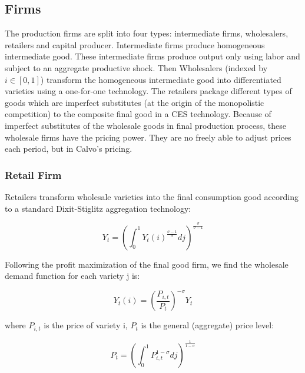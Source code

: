 \documentclass[cn,10pt,math=newtx,citestyle=gb7714-2015,bibstyle=gb7714-2015]{elegantbook}
\begin{document}
{{			
			
			\subsection{Firms}
			
			The production firms are split into four types: intermediate firms, wholesalers, retailers and capital producer. Intermediate firms produce homogeneous intermediate good. These intermediate firms produce output only using labor and subject to an aggregate productive shock. Then Wholesalers (indexed by $i \in [0, 1]$) transform the homogeneous intermediate good into differentiated varieties using a one-for-one technology. The retailers package different types of goods which are imperfect substitutes (at the origin of the monopolistic competition) to the composite final good in a CES technology. Because of imperfect substitutes of the wholesale goods in final production process, these wholesale firms have the pricing power. They are no freely able to adjust prices each period, but in Calvo's pricing.
			
			\subsubsection{Retail Firm}
			
			Retailers transform wholesale varieties into the final consumption good according to a standard Dixit-Stiglitz aggregation technology:
			
			\begin{equation}
				Y_t=\left(\int_0^1Y_t(i)^{\frac{\sigma-1}{\sigma}}dj \right)^{\frac{\sigma}{\sigma-1}}
			\end{equation}
			
			Following the profit maximization of the final good firm, we find the wholesale demand function for each variety j is:
			
			\begin{equation}
				Y_t(i)=\left(\frac{P_{i,t}}{P_t}\right)^{-\sigma}Y_t
			\end{equation}
			
			where $P_{i,t}$ is the price of variety i, $P_t$ is the general (aggregate) price level:
			
			\begin{equation}
				P_t=\left(\int_0^1P_{i,t}^{1-\sigma}dj\right)^{\frac{1}{1-\sigma}}
			\end{equation}
			
}}
\end{document}
